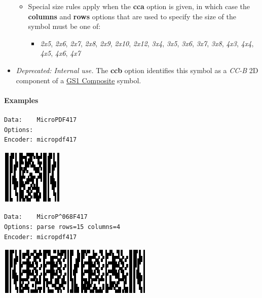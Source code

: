 \begin{itemize}
  \begin{itemize}
  \tightlist
  \item
    Special size rules apply when the \textbf{cca} option is given, in
    which case the \textbf{columns} and \textbf{rows} options that are
    used to specify the size of the symbol must be one of:

    \begin{itemize}
    \tightlist
    \item
      \emph{2x5}, \emph{2x6}, \emph{2x7}, \emph{2x8}, \emph{2x9},
      \emph{2x10}, \emph{2x12}, \emph{3x4}, \emph{3x5}, \emph{3x6},
      \emph{3x7}, \emph{3x8}, \emph{4x3}, \emph{4x4}, \emph{4x5},
      \emph{4x6}, \emph{4x7}
    \end{itemize}
  \end{itemize}
\item
  \emph{Deprecated: Internal use.} The \textbf{ccb} option identifies
  this symbol as a \emph{CC-B} 2D component of a
  \protect\hyperlink{gs1-composite-symbols}{GS1 Composite} symbol.
\end{itemize}

\hypertarget{examples-10}{%
\paragraph{Examples}\label{examples-10}}

\begin{verbatim}
Data:    MicroPDF417
Options: 
Encoder: micropdf417
\end{verbatim}

\includegraphics{images/micropdf417-1.eps}

\begin{verbatim}
Data:    MicroP^068F417
Options: parse rows=15 columns=4
Encoder: micropdf417
\end{verbatim}

\includegraphics{images/micropdf417-2.eps}

